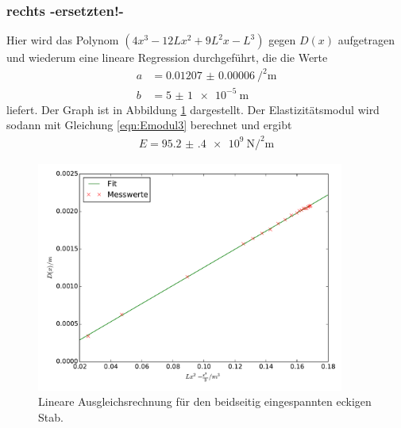 \subsubsection{rechts -ersetzten!-}
Hier wird das Polynom $\left(4 x^3 - 12 L x^2 + 9 L^2 x - L^3\right)$ gegen $D(x)$
aufgetragen und wiederum eine lineare Regression durchgeführt, die die Werte
\begin{align*}
  a &= \SI{0.01207(6)}{\per\squared\meter}\\
  b &= \SI{5(1)e-5}{\meter}
\end{align*}
liefert. Der Graph ist in Abbildung \ref{fig:plot_beidseitig2} dargestellt. Der
Elastizitätsmodul wird sodann mit Gleichung \eqref{eqn:Emodul3} berechnet und ergibt
\begin{align*}
  E = \SI{95.2(4)e+9}{\newton\per\squared\meter}
\end{align*}
\begin{figure}
  \centering
  \includegraphics[width=0.9\textwidth]{stab1_beidseitig_rechts.pdf}
  \caption{Lineare Ausgleichsrechnung für den beidseitig eingespannten eckigen Stab.}
  \label{fig:plot_beidseitig2}
\end{figure}

